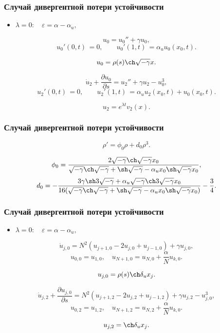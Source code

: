\documentclass[fullscreen=true, unicode, bookmarks=false]{beamer}
\begin{document}
\begin{frame}
\frametitle{ Случай дивергентной потери устойчивости }

\begin{itemize}
\item { $ \lambda = 0: \quad \varepsilon=\alpha-\alpha_u, $
}
\end{itemize}

\vfill

$$
u_0 = u_0'' + \gamma u_0,
$$
$$
u_0'(0, t) \, = 0, \qquad u_0'(1, t) \, = \alpha_u u_0(x_0, t).
$$

$$ u_0 = \rho(s) \ch \sqrt{-\gamma} x. $$

\vfill

$$
\dot u_2 + \frac{\partial u_0}{\partial s} = u_2'' + \gamma u_2 - u_0^3,
$$
$$
u_2'(0, t) \, = 0, \qquad u_2'(1, t) \, = \alpha_u u_2(x_0, t) + u_0(x_0, t).
$$

$$ u_2 = e^{\lambda t}v_2(x). $$

\end{frame}

\begin{frame}
\frametitle{ Случай дивергентной потери устойчивости }

$$
\rho' = \phi_0 \rho + d_0 \rho^3.
$$

\vfill

$$ \phi_0 = \frac{ 2 \sqrt{-\gamma} \ch \sqrt{-\gamma} x_0 }{ \sqrt{-\gamma} \ch \sqrt{-\gamma} +\sh \sqrt{-\gamma} - \alpha_u x_0 \sh \sqrt{-\gamma} x_0 }, $$
$$ d_0 = -\frac{ 3\gamma \sh 3\sqrt{-\gamma} + \alpha_u \sqrt{-\gamma} \ch 3\sqrt{-\gamma} x_0 }{ 16( \sqrt{-\gamma} \ch \sqrt{-\gamma} +\sh \sqrt{-\gamma} - \alpha_u x_0 \sh \sqrt{-\gamma} x_0 ) } - \frac{3}{4}. $$

\end{frame}

\begin{frame}
\frametitle{ Случай дивергентной потери устойчивости }

\begin{itemize}
\item { $ \lambda = 0: \quad \varepsilon=\alpha-\alpha_u, $
}
\end{itemize}

$$
\dot u_{j,0} = N^2(u_{j+1,0} - 2u_{j,0} + u_{j-1,0}) + \gamma u_{j,0},
$$
$$
u_{0,0} = u_{1,0}, \quad u_{N+1,0} = u_{N,0} + \dfrac{\alpha}{N}u_{k,0}.
$$

\vfill

$$ u_{j,0} = \rho(s) \ch \delta_u x_j. $$

$$
\dot u_{j,2} + \frac{\partial u_{j,0}}{\partial s} = N^2(u_{j+1,2} - 2u_{j,2} + u_{j-1,2}) + \gamma u_{j,2} - u_{j,0}^3,
$$
$$
u_{0,2} = u_{1,2}, \quad u_{N+1,2} = u_{N,2} + \dfrac{\alpha}{N}u_{k,0}.
$$

\vfill

$$ u_{j,2} = \ch \delta_u x_j. $$

\end{frame}
\end{document}
